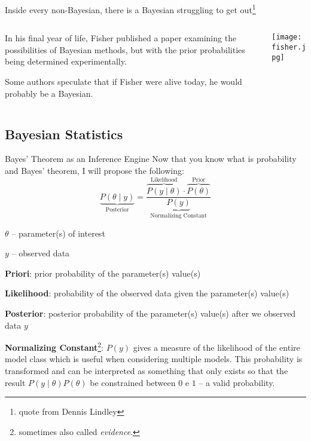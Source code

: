 \begin{frame}{Inside every non-Bayesian, there is a Bayesian struggling to get out\footnote{
			quote from Dennis Lindley}}
	\begin{columns}
		\begin{column}{0.8\textwidth}
			\begin{vfilleditems}
				\item In his final year of life,
				Fisher published a paper \parencite{fisherExamplesBayesMethod1962}
				examining the possibilities of Bayesian methods,
				but with the prior probabilities being determined experimentally.
				\item Some authors speculate \parencite{jaynesProbabilityTheoryLogic2003}
				that if Fisher were alive today, he would probably be a Bayesian.
			\end{vfilleditems}
		\end{column}
		\begin{column}{0.2\textwidth}
			\centering
			\texttt{[image: fisher.jpg]}
		\end{column}
	\end{columns}
\end{frame}

\subsection{Bayesian Statistics}
\begin{frame}{Bayes' Theorem as an Inference Engine}
	\footnotesize Now that you know what is probability and Bayes' theorem,
	I will propose the following:
	$$
		\underbrace{P(\theta \mid y)}_{\text{Posterior}} = \frac{\overbrace{P(y \mid  \theta)}^{\text{Likelihood}} \cdot \overbrace{P(\theta)}^{\text{Prior}}}{\underbrace{P(y)}_{\text{Normalizing Constant}}}
	$$
	\begin{vfilleditems}
		\item \footnotesize $\theta$ -- parameter(s) of interest
		\item \footnotesize $y$ -- observed data
		\item \footnotesize \textbf{Priori}: prior probability of the parameter(s) value(s)
		\item \footnotesize \textbf{Likelihood}: probability of the observed data given the parameter(s) value(s)
		\item \footnotesize \textbf{Posterior}: posterior probability of the parameter(s) value(s) after we observed data $y$
		\item \footnotesize \textbf{Normalizing Constant}\footnote{sometimes also called \textit{evidence}.}: $P(y)$ gives a measure of the likelihood of the entire model class which is useful when considering multiple models.
		This probability is transformed and can be interpreted as something that only exists so that the result $P(y \mid \theta) P(\theta)$ be constrained between $0$ e $1$
		-- a valid probability.
	\end{vfilleditems}
\end{frame}

